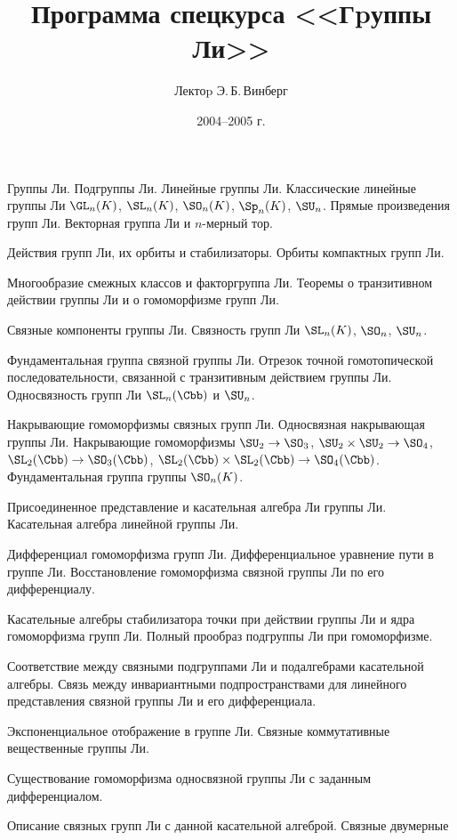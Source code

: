 \documentclass[a4paper]{article}
\title{Программа спецкурса <<Гpуппы Ли>>}
\author{Лектоp Э.\,Б.\,Винберг}
\date{2004--2005 г.}
\begin{document}
\maketitle

\begin{nums}{0}
\item Группы Ли. Подгруппы Ли. Линейные группы Ли. Классические линейные группы
Ли $\GL_n(K)$, $\SL_n(K)$, $\SO_n(K)$, $\Sp_n(K)$, $\SU_n$. Прямые произведения
групп Ли. Векторная группа Ли и $n$-мерный тор.
\item Действия групп Ли, их орбиты и стабилизаторы. Орбиты компактных групп Ли.
\item Многообразие смежных классов и факторгруппа Ли. Теоремы о транзитивном
действии группы Ли и о гомоморфизме групп Ли.
\item Связные компоненты группы Ли. Связность групп Ли $\SL_n(K)$, $\SO_n$, $\SU_n$.
\item Фундаментальная группа связной группы Ли. Отрезок точной гомотопической
последовательности, связанной с транзитивным действием группы Ли.
Односвязность групп Ли $\SL_n({\Cbb})$ и $\SU_n$.
\item Накрывающие гомоморфизмы связных групп Ли. Односвязная накрывающая группы Ли.
Накрывающие гомоморфизмы $\SU_2\to \SO_3$, $\SU_2\times \SU_2\to \SO_4$,
$\SL_2(\Cbb)\to \SO_3(\Cbb)$, $\SL_2(\Cbb)\times \SL_2(\Cbb)\to \SO_4(\Cbb)$.
Фундаментальная группа группы $\SO_n(K)$.
\item Присоединенное представление и касательная алгебра Ли группы Ли. Касательная
алгебра линейной группы Ли.
\item Дифференциал гомоморфизма групп Ли. Дифференциальное уравнение пути в группе Ли.
Восстановление гомоморфизма связной группы Ли по его дифференциалу.
\item Касательные алгебры стабилизатора точки при действии группы Ли и ядра
гомоморфизма групп Ли. Полный прообраз подгруппы Ли при гомоморфизме.
\item Соответствие между связными подгруппами Ли и подалгебрами касательной алгебры.
Связь между инвариантными подпространствами для линейного представления связной
группы Ли и его дифференциала.
\item Экспоненциальное отображение в группе Ли. Связные коммутативные вещественные
группы Ли.
\item Существование гомоморфизма односвязной группы Ли с заданным дифференциалом.
\item Описание связных групп Ли с данной касательной алгеброй. Связные двумерные

\end{nums}
\end{document}
